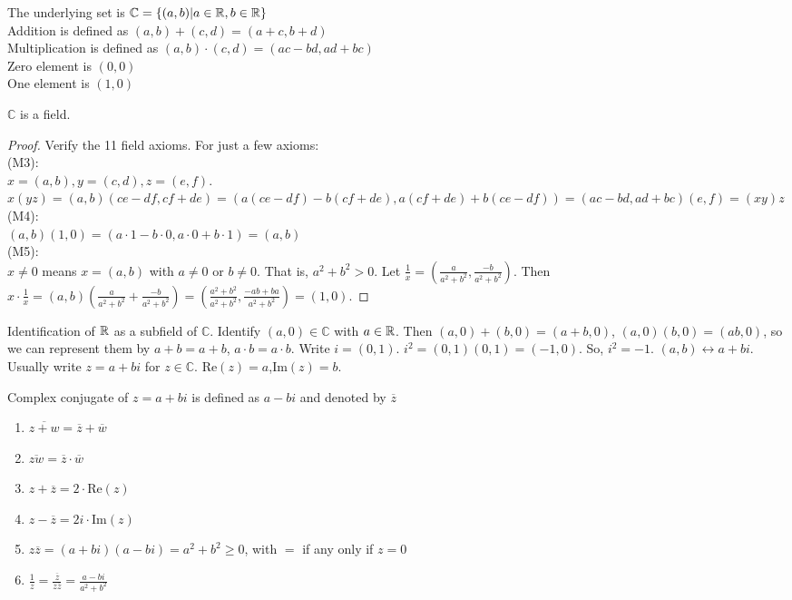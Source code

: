 \begin{definition}
	The underlying set is $\mathbb{C}=\{(a,b)| a \in \mathbb{R} , b \in \mathbb{R} \}$\\
	Addition is defined as $(a,b)+(c,d)=(a+c,b+d)$\\
	Multiplication is defined as $(a,b)\cdot(c,d)=(ac-bd,ad+bc)$\\
	Zero element is $(0,0)$\\
	One element is $(1,0)$\\
\end{definition}
\begin{theorem}
	$\mathbb{C}$ is a field.
	\begin{proof}
		Verify the 11 field axioms.
		For just a few axioms:\\
		(M3):\\
		$x=(a,b), y=(c,d), z=(e,f)$.
		$x(yz)=(a,b)(ce-df,cf+de)=(a(ce-df)-b(cf+de),a(cf+de)+b(ce-df))=(ac-bd,ad+bc)(e,f)=(xy)z$\\
		(M4):\\
		$(a,b)(1,0)=(a\cdot 1-b\cdot0,a\cdot 0+b\cdot 1)=(a,b)$\\
		(M5):\\
		$x \neq 0$ means $x=(a,b)$ with $a\neq 0$ or $b\neq 0$. That is, $a^2+b^2>0$. Let $\frac{1}{x}=(\frac{a}{a^2+b^2},\frac{-b}{a^2+b^2})$. Then $x\cdot \frac{1}{x}=(a,b)(\frac{a}{a^2+b^2}+\frac{-b}{a^2+b^2})=(\frac{a^2+b^2}{a^2+b^2},\frac{-ab+ba}{a^2+b^2})=(1,0)$.
	\end{proof}
\end{theorem}
Identification of $\mathbb{R} $ as a subfield of $\mathbb{C}$. Identify $(a,0) \in \mathbb{C}$ with $a \in \mathbb{R} $. Then $(a,0)+(b,0)=(a+b,0)$, $(a,0)(b,0)=(ab,0)$, so we can represent them by $a+b=a+b$, $a \cdot b=a\cdot b$.
Write $i=(0,1)$. $i^2=(0,1)(0,1)=(-1,0)$. So, $i^2=-1$.
$(a,b) \leftrightarrow a+bi$.
Usually write $z=a+bi$ for $z \in \mathbb{C}$.
$\text{Re}(z)=a$,$\text{Im}(z)=b$.
\begin{definition}
	Complex conjugate of $z=a+bi$ is defined as $a-bi$ and denoted by $\overline{z}$
\end{definition}
\begin{note}\hfill
	\begin{enumerate}
		\item $\overline{z+w}=\overline{z}+\overline{w}$
		\item $\overline{zw}=\overline{z}\cdot \overline{w}$
		\item $z+\overline{z}=2\cdot  \text{Re}(z)$
		\item $z-\overline{z}=2i \cdot \text{Im}(z)$
		\item $z\overline{z}=(a+bi)(a-bi)=a^2+b^2\ge 0$, with $=$ if any only if $z=0$
		\item $\frac{1}{z}=\frac{\overline{z}}{z \overline{z}}=\frac{a-bi}{a^2+b^2}$
	\end{enumerate}
\end{note}
